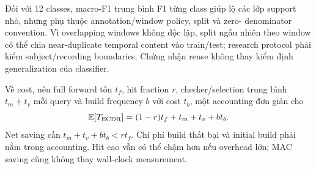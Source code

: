 \documentclass[11pt,a4paper]{article}
\newcommand{\E}{\mathbb E}
\theoremstyle{definition}
\begin{document}
Đối với 12 classes, macro-F1 trung bình F1 từng class giúp lộ các lớp
support nhỏ, nhưng phụ thuộc annotation/window policy, split và zero-
denominator convention. Vì overlapping windows không độc lập, split
ngẫu nhiên theo window có thể chia near-duplicate temporal content vào
train/test; research protocol phải kiểm subject/recording boundaries.
Chứng nhận reuse không thay kiểm định generalization của classifier.

Về cost, nếu full forward tốn $t_f$, hit fraction $r$, checker/selection
trung bình $t_m+t_v$ mỗi query và build frequency $b$ với cost $t_b$,
một accounting đơn giản cho
\begin{equation}
\E[T_{\rm ECDR}]=(1-r)t_f+t_m+t_v+bt_b.
\end{equation}
Net saving cần $t_m+t_v+bt_b<rt_f$. Chi phí build thất bại và initial
build phải nằm trong accounting. Hit cao vẫn có thể chậm hơn nếu
overhead lớn; MAC saving cũng không thay wall-clock measurement.
\end{document}
